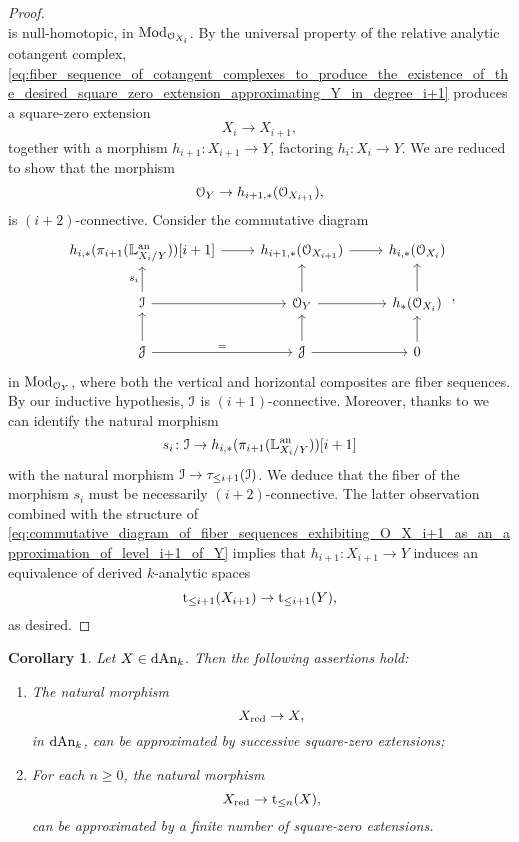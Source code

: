 \documentclass[10pt,a4paper,reqno]{amsart} %
\theoremstyle{plain}
\newtheorem{cor}[thm]{Corollary}
\theoremstyle{definition}
\theoremstyle{remark}
\numberwithin{equation}{section}
\begin{document}
\begin{proof}
\begin{equation}
        \end{equation}
    is null-homotopic, in $\mathrm{Mod}_{\mathcal O_{X_i}}$. By the universal property of the relative analytic cotangent complex,
    \eqref{eq:fiber_sequence_of_cotangent_complexes_to_produce_the_existence_of_the_desired_square_zero_extension_approximating_Y_in_degree_i+1}
    produces a square-zero extension
        \[
            X_i  \to X_{i+1},
        \]
    together with a morphism $h_{i+1} \colon X_{i+1} \to Y$, factoring $h_i \colon X_i \to Y$. We  are reduced to show that the morphism
        \[
            \mathcal O_Y \to h_{i+1, *}(\mathcal O_{X_{i+1}}), 
        \]
    is $(i+2)$-connective. Consider the commutative diagram
        \begin{equation} \label{eq:commutative_diagram_of_fiber_sequences_exhibiting_O_X_i+1_as_an_approximation_of_level_i+1_of_Y}
        \begin{tikzcd}
            h_{i, *}(\pi_{i+1}(\bbL\an_{X_i/Y}))[i+1] \ar{r} & h_{i+1, *}(\cO_{X_{i+1}}) \ar{r} & h_{i, *}(\cO_{X_i}) \\
            \cI \ar{r} \ar{u}{s_i} & \cO_Y \ar{r} \ar{u} & h_*(\cO_{X_i}) \ar{u} \\
            \cJ \ar{r}{=} \ar{u} & \cJ \ar{r} \ar{u} & 0 \ar{u}
        \end{tikzcd},
        \end{equation}
    in $\mathrm{Mod}_{\mathcal O_Y}$, where both the vertical and horizontal composites are fiber sequences. By our inductive hypothesis, $\mathcal I$ is $(i+1)$-connective.
    Moreover, thanks to \cite[Proposition 5.34]{Porta_Yu_Representability} we can identify the natural
    morphism    
        \[
           s_i \colon \mathcal I \to h_{i, *}(\pi_{i+1}(\mathbb L^\mathrm{an}_{X_i/Y}))[i + 1]
        \]
    with the natural morphism $\mathcal I \to \tau_{\le i + 1}(\mathcal I)$. We deduce that the fiber of the morphism $s_i$ must be necessarily $(i+2)$-connective. The latter observation
    combined with the structure of \eqref{eq:commutative_diagram_of_fiber_sequences_exhibiting_O_X_i+1_as_an_approximation_of_level_i+1_of_Y}
    implies that $h_{i+1} \colon X_{i+1} \to Y$ induces an equivalence of derived $k$-analytic spaces
        \[
            \mathrm t_{\le i+1}(X_{i+1}) \to \mathrm t_{\le i+1}(Y),  
        \]
    as desired.
\end{proof}

\begin{cor}
    Let $X \in \mathrm{dAn}_k$. Then the following assertions hold:
    \begin{enumerate}
        \item The natural morphism
            \[
                X_{\mathrm{red}} \to X,  
            \]
         in $\mathrm{dAn}_k$, can be \emph{approximated} by successive square-zero extensions;
        \item For each $n \ge 0$, the natural morphism
            \[
                X_{\mathrm{red}} \to \mathrm t_{\le n}(X),  
            \]
        can be \emph{approximated} by a finite number of square-zero extensions.
    \end{enumerate}
\end{cor}
\end{document}
